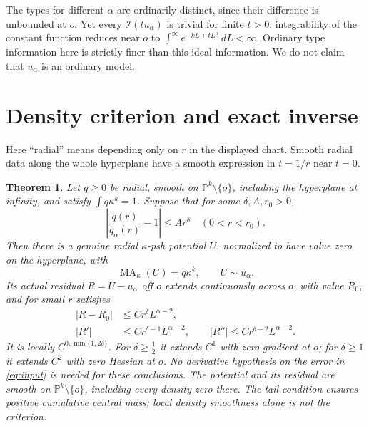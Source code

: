 \documentclass[11pt]{article}
\newcommand{\PP}{\mathbb P}
\newcommand{\MA}{\operatorname{MA}}
\newcommand{\I}{\mathcal I}
\newtheorem{theorem}{Theorem}
\theoremstyle{remark}\newtheorem{remark}[theorem]{Remark}
\begin{document}
The types for different $\alpha$ are ordinarily distinct, since
their difference is unbounded at $o$. Yet every $\I(tu_\alpha)$
is trivial for finite $t>0$: integrability of the constant function
reduces near $o$ to
$\int^\infty e^{-kL+tL^\alpha}\,dL<\infty$.
Ordinary type information here is strictly finer than this ideal
information. We do not claim that $u_\alpha$ is an ordinary model.

\section{Density criterion and exact inverse}
Here ``radial'' means depending only on $r$ in the displayed chart.
Smooth radial data along the whole hyperplane have a smooth
expression in $t=1/r$ near $t=0$.

\begin{theorem}\label{thm:regularity}
Let $q\ge0$ be radial, smooth on $\PP^k\setminus\{o\}$, including
the hyperplane at infinity, and satisfy $\int q\kappa^k=1$.
Suppose that for some $\delta,A,r_0>0$,
\begin{equation}\label{eq:input}
 \left|\frac{q(r)}{q_\alpha(r)}-1\right|\le Ar^\delta
 \quad(0<r<r_0).
\end{equation}
Then there is a genuine radial $\kappa$-psh potential $U$, normalized
to have value zero on the hyperplane, with
\[
 \MA_\kappa(U)=q\kappa^k,
 \qquad U\sim u_\alpha.
\]
Its actual residual $R=U-u_\alpha$ off $o$ extends continuously
across $o$, with value $R_0$, and for small $r$ satisfies
\begin{equation}\label{eq:residual}
 \begin{aligned}
 |R-R_0|&\le Cr^\delta L^{\alpha-2},\\
 |R'|&\le Cr^{\delta-1}L^{\alpha-2},\qquad
 |R''|\le Cr^{\delta-2}L^{\alpha-2}.
 \end{aligned}
\end{equation}
It is locally $C^{0,\min\{1,2\delta\}}$.
For $\delta\ge\frac12$ it extends $C^1$ with zero gradient at $o$;
for $\delta\ge1$ it extends $C^2$ with zero Hessian at $o$.
No derivative hypothesis on the error in \eqref{eq:input} is needed
for these conclusions.
The potential and its residual are smooth on $\PP^k\setminus\{o\}$,
including every density zero there. The tail condition ensures positive
cumulative central mass; local density smoothness alone is not the criterion.
\end{theorem}
\end{document}
